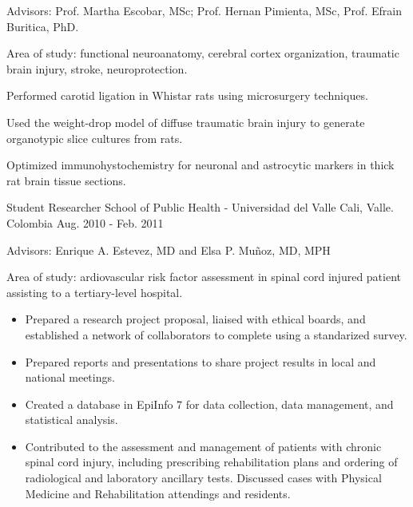 \begin{cventries}
{\begin{cvitems}
        \item {Advisors: Prof. Martha Escobar, MSc; Prof. Hernan Pimienta, MSc, Prof. Efrain Buritica, PhD.}
        \item {Area of study: functional neuroanatomy, cerebral cortex organization, traumatic brain injury, stroke, neuroprotection.}
        \item {Performed carotid ligation in Whistar rats using microsurgery techniques.}
        \item {Used the weight-drop model of diffuse traumatic brain injury to generate organotypic slice cultures from rats.}
        \item {Optimized immunohystochemistry for neuronal and astrocytic markers in thick rat brain tissue sections.}
      \end{cvitems}
    }
\vspace{10pt}
  \cventry
  {Student Researcher} %
  {School of Public Health - Universidad del Valle} %
  {Cali, Valle. Colombia} %
  {Aug. 2010 - Feb. 2011} %
  {
  \begin{cvitems} %
    \item {Advisors: Enrique A. Estevez, MD and Elsa P. Muñoz, MD, MPH}
    \item {Area of study: ardiovascular risk factor assessment in spinal cord injured patient assisting to a tertiary-level
    hospital.}
    \begin{itemize}
      \item {Prepared a research project proposal, liaised with ethical boards, and established a network of collaborators to complete using a standarized survey.}
      \item {Prepared reports and presentations to share project results in local and national meetings.}
      \item {Created a database in EpiInfo 7 for data collection, data management, and statistical analysis.}
      \item {Contributed to the assessment and management of patients with chronic spinal cord injury, including prescribing rehabilitation plans and ordering of radiological and laboratory ancillary tests. Discussed cases with Physical Medicine and Rehabilitation attendings and residents.}
    \end{itemize}
  \end{cvitems}
  }
  \vspace{5pt}
 

\end{cventries}
